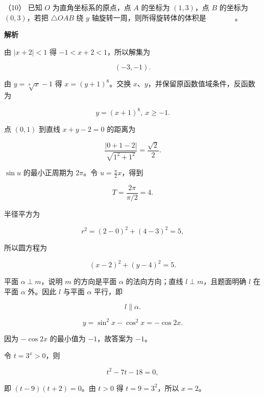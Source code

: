 \begin{answer}
（10） 已知 $O$ 为直角坐标系的原点，点 $A$ 的坐标为 $(1,3)$，点 $B$ 的坐标为 $(0,3)$，若把 $\triangle OAB$ 绕 $y$ 轴旋转一周，则所得旋转体的体积是　　　　。

\textbf{解析}


由 $|x+2|<1$ 得 $-1<x+2<1$，所以解集为

\nopagebreak[4]
\[
(-3,-1).
\]


由 $y=\sqrt[8]{x}-1$ 得 $x=(y+1)^8$。交换 $x\text{、}y$，并保留原函数值域条件，反函数为

\nopagebreak[4]
\[
y=(x+1)^8,\ x\ge-1.
\]


点 $(0,1)$ 到直线 $x+y-2=0$ 的距离为

\nopagebreak[4]
\[
\frac{|0+1-2|}{\sqrt{1^2+1^2}}=\frac{\sqrt2}{2}.
\]


$\sin u$ 的最小正周期为 $2\pi$。令 $u=\frac\pi2x$，得到

\nopagebreak[4]
\[
T=\frac{2\pi}{\pi/2}=4.
\]


半径平方为

\nopagebreak[4]
\[
r^2=(2-0)^2+(4-3)^2=5,
\]

所以圆方程为

\nopagebreak[4]
\[
(x-2)^2+(y-4)^2=5.
\]


平面 $\alpha\perp m$，说明 $m$ 的方向是平面 $\alpha$ 的法向方向；直线 $l\perp m$，且题面明确 $l$ 在平面 $\alpha$ 外。因此 $l$ 与平面 $\alpha$ 平行，即

\nopagebreak[4]
\[
l\parallel\alpha.
\]


\nopagebreak[4]
\[
y=\sin^2x-\cos^2x=-\cos2x.
\]

因为 $-\cos2x$ 的最小值为 $-1$，故答案为 $-1$。


令 $t=3^x>0$，则

\nopagebreak[4]
\[
t^2-7t-18=0,
\]

即 $(t-9)(t+2)=0$。由 $t>0$ 得 $t=9=3^2$，所以 $x=2$。


\end{answer}
